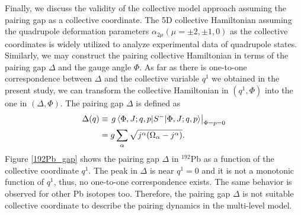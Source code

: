 \documentclass[%
superscriptaddress,
showpacs,
nofootinbib,
amsmath,amssymb,
aps,
prc,
twocolumn,
floatfix ]%
{revtex4-1}
\begin{document}
Finally, we discuss the validity of the collective model approach
assuming the pairing gap as a collective coordinate.
The 5D collective Hamiltonian assuming the quadrupole deformation
parameters $\alpha_{2\mu} (\mu=\pm2,\pm1,0)$ as the collective coordinates
is widely utilized to analyze experimental data of quadrupole states.
Similarly, we may construct the pairing collective Hamiltonian
in terms of the pairing gap $\Delta$ and the gauge angle $\Phi$. 
As far as there is one-to-one correspondence between $\Delta$ 
and the collective variable $q^1$ we obtained in the present study,
we can transform the collective Hamiltonian in $(q^1,\Phi)$
into the one in $(\Delta,\Phi)$.
The pairing gap $\Delta$ is defined as
\begin{align}
  \Delta (q) &\equiv \left. g\braket{\Phi,J;q,p|S^-|\Phi,J;q,p} \right|_{\Phi=p=0} \nonumber \\
  &= g\sum_\alpha \sqrt{j^\alpha(\Omega_\alpha-j^\alpha)} .
\end{align}
Figure \ref{192Pb_gap} shows the pairing gap $\Delta$ in ${}^{192}$Pb
as a function of the collective coordinate $q^1$.
The peak in $\Delta$ is near $q^1=0$ and it is not a monotonic
function of $q^1$, thus, no one-to-one correspondence exists.
The same behavior is observed for other Pb isotopes too.
Therefore, the pairing gap $\Delta$ is not suitable collective coordinate
to describe the pairing dynamics in the multi-level model.



\end{document}
